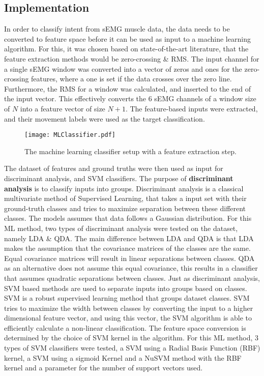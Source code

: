 \documentclass[../main.tex]{subfiles}
\begin{document}
\subsection{Implementation}

In order to classify intent from sEMG muscle data, the data needs to be converted to feature space before it can be used as input to a machine learning algorithm.
For this, it was chosen based on state-of-the-art literature, that the feature extraction methods would be zero-crossing \& RMS.
The input channel for a single sEMG window was converted into a vector of zeros and ones for the zero-crossing features, where a one is set if the data crosses over the zero line.
Furthermore, the RMS for a window was calculated, and inserted to the end of the input vector. This effectively converts the 6 sEMG channels of a window size of $N$ into a feature vector of size $N+1$.
The feature-based inputs were extracted, and their movement labels were used as the target classification.

\begin{figure}[H]
\begin{center}
\texttt{[image: MLClassifier.pdf]}
\caption{The machine learning classifier setup with a feature extraction step.}
\label{fig:mlclassifier}
\end{center}
\end{figure}

The dataset of features and ground truths were then used as input for discriminant analysis, and SVM classifiers.
The purpose of \textbf{discriminant analysis} is to classify inputs into groups.
Discriminant analysis is a classical multivariate method of Supervised Learning, that takes a input set with their ground-truth classes and tries to maximize separation between these different classes.
The models assumes that data follows a Gaussian distribution. 
For this ML method, two types of discriminant analysis were tested on the dataset, namely \gls{LDA} \& \gls{QDA}.
The main difference between LDA and QDA is that LDA makes the assumption that the covariance matrices of the classes are the same.
Equal covariance matrices will result in linear separations between classes.
QDA as an alternative does not assume this equal covariance, this results in a classifier that assumes quadratic separations between classes.
Just as discriminant analysis, SVM based methods are used to separate inputs into groups based on classes.
SVM is a robust supervised learning method that groups dataset classes.
SVM tries to maximize the width between classes by converting the input to a higher dimensional feature vector, and using this vector, the SVM algorithm is able to efficiently calculate a non-linear classification.
The feature space conversion is determined by the choice of SVM kernel in the algorithm.
For this ML method, 3 types of SVM classifiers were tested, a SVM using a Radial Basis Function (RBF) kernel, a SVM using a sigmoid Kernel and a NuSVM method with the RBF kernel and a parameter for the number of support vectors used.
\end{document}
